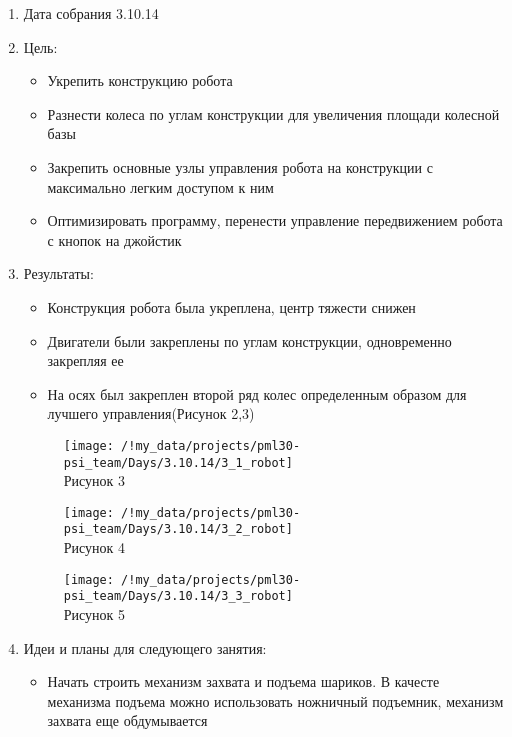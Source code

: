 
\begin{enumerate}
		\item Дата собрания 3.10.14
		\item Цель:
		\begin{itemize}
			\item Укрепить конструкцию робота
			\item Разнести колеса по углам конструкции для увеличения площади колесной базы
			\item Закрепить основные узлы управления робота на конструкции с максимально легким доступом к ним
			\item Оптимизировать программу, перенести управление передвижением робота с кнопок на джойстик
		\end{itemize}
		\item Результаты:
		\begin{itemize}
			\item Конструкция робота была укреплена, центр тяжести снижен 
			\item Двигатели были закреплены по углам конструкции, одновременно закрепляя ее
			\item На осях был закреплен второй ряд колес определенным образом для лучшего управления(Рисунок 2,3)
		\end{itemize}
		\begin{figure} [h]
			\centering
			\begin{minipage}{0.3\linewidth}
				\texttt{[image: /!my\_data/projects/pml30-psi\_team/Days/3.10.14/3\_1\_robot]}\\ Рисунок 3
			\end{minipage}
			\begin{minipage}{0.3\linewidth}
				\texttt{[image: /!my\_data/projects/pml30-psi\_team/Days/3.10.14/3\_2\_robot]}\\ Рисунок 4
			\end{minipage}
			\begin{minipage}{0.3\linewidth}
				\texttt{[image: /!my\_data/projects/pml30-psi\_team/Days/3.10.14/3\_3\_robot]}\\ Рисунок 5
			\end{minipage}
		\end{figure}
		\item Идеи и планы для следующего занятия:
		\begin{itemize}
			\item Начать строить механизм захвата и подъема шариков. В качесте механизма подъема можно использовать ножничный подъемник, механизм захвата еще обдумывается
		\end{itemize}
	\end{enumerate}
\newpage